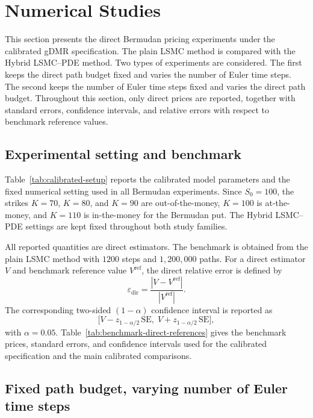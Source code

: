 \section{Numerical Studies}\label{sec:numerical}

This section presents the direct Bermudan pricing experiments under the calibrated gDMR specification. The plain LSMC method \cite{longstaff2001valuing} is compared with the Hybrid LSMC--PDE method. Two types of experiments are considered. The first keeps the direct path budget fixed and varies the number of Euler time steps. The second keeps the number of Euler time steps fixed and varies the direct path budget. Throughout this section, only direct prices are reported, together with standard errors, confidence intervals, and relative errors with respect to benchmark reference values.

\subsection{Experimental setting and benchmark}

Table~\ref{tab:calibrated-setup} reports the calibrated model parameters and the fixed numerical setting used in all Bermudan experiments. Since \(S_0 = 100\), the strikes \(K = 70\), \(K = 80\), and \(K = 90\) are out-of-the-money, \(K = 100\) is at-the-money, and \(K = 110\) is in-the-money for the Bermudan put. The Hybrid LSMC--PDE settings are kept fixed throughout both study families.



All reported quantities are direct estimators. The benchmark is obtained from the plain LSMC method with \(1200\) steps and \(1{,}200{,}000\) paths. For a direct estimator \(V\) and benchmark reference value \(V^{\mathrm{ref}}\), the direct relative error is defined by
\[
\varepsilon_{\mathrm{dir}}=\frac{|V-V^{\mathrm{ref}}|}{|V^{\mathrm{ref}}|}.
\]
The corresponding two-sided \((1-\alpha)\) confidence interval is reported as
\[
\bigl[V-z_{1-\alpha/2}\,\mathrm{SE},\; V+z_{1-\alpha/2}\,\mathrm{SE}\bigr],
\]
with \(\alpha=0.05\). Table~\ref{tab:benchmark-direct-references} gives the benchmark prices, standard errors, and confidence intervals used for the calibrated specification and the main calibrated comparisons.



\subsection{Fixed path budget, varying number of Euler time steps}

